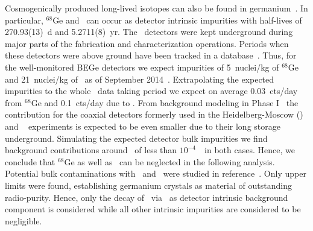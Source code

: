 Cosmogenically produced long-lived isotopes can also be found in
germanium~\cite{Meierhofer2009, Meierhofer2010, Meierhofer2012}. In particular, $^{68}$Ge
and \Co\ can occur as detector intrinsic impurities with half-lives of 270.93(13)~d and
5.2711(8)~yr.  The \bege\ detectors were kept underground during major parts of the
fabrication and characterization operations. Periods when these detectors were above
ground have been tracked in a database~\cite{Agostini2015e}.  Thus, for the well-monitored
BEGe detectors we expect impurities of 5~nuclei/kg of $^{68}$Ge and 21~nuclei/kg of \Co\
as of September 2014~\cite{Agostini2015e}. Extrapolating the expected impurities to the
whole \phasetwo\ data taking period we expect on average 0.03~cts/day from $^{68}$Ge and
0.1~cts/day due to \Co. From background modeling in Phase I~\cite{Agostini2013a} the
contribution for the coaxial detectors formerly used in the Heidelberg-Moscow
(\hdm)~\cite{Klapdor2001} and \igex~\cite{Aalseth2002} experiments is expected to be even
smaller due to their long storage underground. Simulating the expected detector bulk
impurities we find background contributions around \qbb\ of less than $10^{-4}$~\ctsper\
in both cases. Hence, we conclude that $^{68}$Ge as well as \Co\ can be neglected in the
following analysis. Potential bulk contaminations with \Uh\ and \Thh\ were studied in
reference~\cite{Agostini2016a}. Only upper limits were found, establishing germanium
crystals as material of outstanding radio-purity.  Hence, only the decay of \gesix\ via
\nnbb\ as detector intrinsic background component is considered while all other intrinsic
impurities are considered to be negligible.

